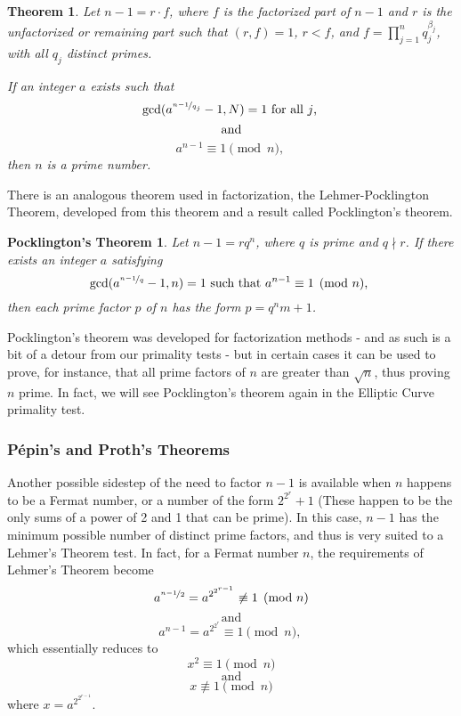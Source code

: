 \documentclass{article}
\newtheorem*{theorem}{Theorem}
\begin{document}
\begin{theorem}
Let $n - 1 = r \cdot f$, where $f$ is the factorized part of $n-1$ and $r$ is the unfactorized or remaining part such that $(r,f) = 1$, $r < f$, and $f = \prod^n_{j=1} q_j^{\beta_j}$, with all $q_j$ distinct primes.
\par If an integer $a$ exists such that
	$$\textnormal{gcd}(a^{\nicefrac{n-1}{q_j}} - 1, N) = 1 \text{ for all } j \text{, }$$
	$$\textnormal{ and }$$
	$$a^{n-1} \equiv 1 \pmod n \text{, }$$
then $n$ is a prime number.
\end{theorem}

There is an analogous theorem used in factorization, the Lehmer-Pocklington Theorem, developed from this theorem and a result called Pocklington's theorem.

\newtheorem*{pocklington}{Pocklington's Theorem}
\begin{pocklington}
Let $n - 1 = rq^n$, where $q$ is prime and $q \nmid r$. If there exists an integer $a$ satisfying
	$$\textnormal{gcd}(a^{\nicefrac{n-1}{q}} - 1, n) = 1 \textnormal{ such that } a^{n-1} \equiv 1 \pmod n \text{, }$$
then each prime factor $p$ of $n$ has the form $p = q^nm +1$.
\end{pocklington}

\par Pocklington's theorem was developed for factorization methods - and as such is a bit of a detour from our primality tests - but in certain cases it can be used to prove, for instance, that all prime factors of $n$ are greater than $\sqrt{n}$, thus proving $n$ prime. In fact, we will see Pocklington's theorem again in the Elliptic Curve primality test.


\subsubsection*{P\'{e}pin's and Proth's Theorems}
Another possible sidestep of the need to factor $n-1$ is available when $n$ happens to be a Fermat number, or a number of the form $2^{2^r} + 1$ (These happen to be the only sums of a power of 2 and 1 that can be prime). In this case, $n - 1$ has the minimum possible number of distinct prime factors, and thus is very suited to a Lehmer's Theorem test. In fact, for a Fermat number $n$, the requirements of Lehmer's Theorem become
	$$a^{\nicefrac{n - 1}{2}} = a^{2^{2^{r-1}}} \not\equiv 1 \pmod n $$
	$$\text{ and } $$
	$$a^{n - 1} = a^{2^{2^{r}}} \equiv 1 \pmod n \text{, }$$
which essentially reduces to 
	$$x^2 \equiv 1 \pmod n$$
	$$\text{ and }$$
	$$x \not \equiv 1 \pmod n$$
where $x = a^{2^{2^{r-1}}}$.
\end{document}
